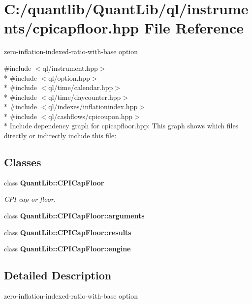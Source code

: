 \section{C\+:/quantlib/\+Quant\+Lib/ql/instruments/cpicapfloor.hpp File Reference}
\label{cpicapfloor_8hpp}


zero-\/inflation-\/indexed-\/ratio-\/with-\/base option  


{\ttfamily \#include $<$ql/instrument.\+hpp$>$}\\*
{\ttfamily \#include $<$ql/option.\+hpp$>$}\\*
{\ttfamily \#include $<$ql/time/calendar.\+hpp$>$}\\*
{\ttfamily \#include $<$ql/time/daycounter.\+hpp$>$}\\*
{\ttfamily \#include $<$ql/indexes/inflationindex.\+hpp$>$}\\*
{\ttfamily \#include $<$ql/cashflows/cpicoupon.\+hpp$>$}\\*
Include dependency graph for cpicapfloor.\+hpp\+:
This graph shows which files directly or indirectly include this file\+:
\subsection*{Classes}
\begin{DoxyCompactItemize}
\item 
class {\bf Quant\+Lib\+::\+C\+P\+I\+Cap\+Floor}
\begin{DoxyCompactList}\small\item\em C\+PI cap or floor. \end{DoxyCompactList}\item 
class {\bf Quant\+Lib\+::\+C\+P\+I\+Cap\+Floor\+::arguments}
\item 
class {\bf Quant\+Lib\+::\+C\+P\+I\+Cap\+Floor\+::results}
\item 
class {\bf Quant\+Lib\+::\+C\+P\+I\+Cap\+Floor\+::engine}
\end{DoxyCompactItemize}


\subsection{Detailed Description}
zero-\/inflation-\/indexed-\/ratio-\/with-\/base option 

